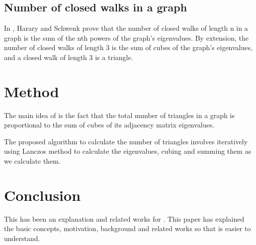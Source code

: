 \documentclass{acm_proc_article-sp}
\begin{document}
\subsection{Number of closed walks in a graph}
In \cite{harary}, Harary and Schwenk prove that the number of closed walks of
length n in a graph is the sum of the nth powers of the graph's eigenvalues. By
extension, the number of closed walks of length 3 is the sum of cubes of the
graph's eigenvalues, and a closed walk of length 3 is a triangle.

\section{Method}
The main idea of \cite{original} is the fact that the total number of triangles
in a graph is proportional to the sum of cubes of its adjacency matrix
eigenvalues.

The proposed algorithm to calculate the number of triangles involves
iteratively using Lanczos method to calculate the eigenvalues, cubing and
summing them as we calculate them.

\section{Conclusion}
This has been an explanation and related works for \cite{original}. This paper
has explained the basic concepts, motivation, background and related works so
that \cite{original} is easier to understand.

%

%
%
\end{document}
